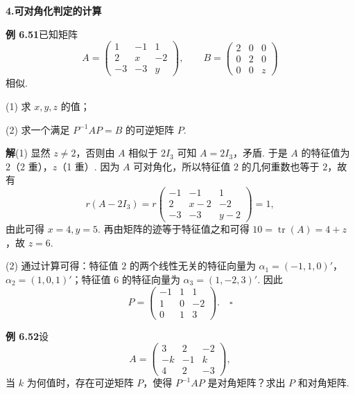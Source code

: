 \documentclass[UTF8,12pt,a4paper,fontset=fandol]{ctexart}
\begin{document}
\noindent\textbf{4.\quad 可对角化判定的计算}

\noindent\textbf{例 6.51}\quad 已知矩阵
\[
A=\left(\begin{array}{ccc}
1 & -1 & 1\\
2 & x & -2\\
-3 & -3 & y
\end{array}\right),\qquad
B=\left(\begin{array}{ccc}
2 & 0 & 0\\
0 & 2 & 0\\
0 & 0 & z
\end{array}\right)
\]
相似.

(1) 求 $x,y,z$ 的值；

(2) 求一个满足 $P^{-1}AP=B$ 的可逆矩阵 $P$.

\noindent\textbf{解}\quad (1) 显然 $z\ne 2$，否则由 $A$ 相似于 $2I_3$ 可知 $A=2I_3$，矛盾. 于是 $A$ 的特征值为 $2$（2 重），$z$（1 重）. 因为 $A$ 可对角化，所以特征值 $2$ 的几何重数也等于 $2$，故有
\[
r(A-2I_3)=r\left(\begin{array}{ccc}
-1 & -1 & 1\\
2 & x-2 & -2\\
-3 & -3 & y-2
\end{array}\right)=1,
\]
由此可得 $x=4,y=5$. 再由矩阵的迹等于特征值之和可得 $10=\operatorname{tr}(A)=4+z$，故 $z=6$.

(2) 通过计算可得：特征值 $2$ 的两个线性无关的特征向量为 $\alpha_1=(-1,1,0)'$，$\alpha_2=(1,0,1)'$；特征值 $6$ 的特征向量为 $\alpha_3=(1,-2,3)'$. 因此
\[
P=\left(\begin{array}{ccc}
-1 & 1 & 1\\
1 & 0 & -2\\
0 & 1 & 3
\end{array}\right). \quad \square
\]

\noindent\textbf{例 6.52}\quad 设
\[
A=\left(\begin{array}{ccc}
3 & 2 & -2\\
-k & -1 & k\\
4 & 2 & -3
\end{array}\right),
\]
当 $k$ 为何值时，存在可逆矩阵 $P$，使得 $P^{-1}AP$ 是对角矩阵？求出 $P$ 和对角矩阵.
\end{document}
